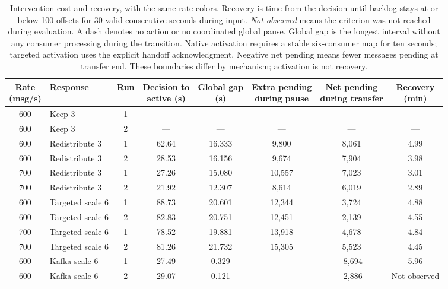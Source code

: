 \begin{table}[!htbp]
\centering\footnotesize
\setlength{\tabcolsep}{3pt}
\renewcommand{\arraystretch}{1.12}
\begin{tabular}{@{}clcccccc@{}}
\toprule
\rowcolor[HTML]{DDE3EA}
\shortstack{Rate\\(msg/s)} & Response & Run & \shortstack{Decision to\\active (s)} & \shortstack{Global gap\\(s)} & \shortstack{Extra pending\\during pause} & \shortstack{Net pending\\during transfer} & \shortstack{Recovery\\(min)}\\
\midrule
\rowcolor[HTML]{FFE1AD}
600 & Keep 3 & 1 & --- & --- & --- & --- & ---\\
\rowcolor[HTML]{FFE1AD}
600 & Keep 3 & 2 & --- & --- & --- & --- & ---\\
\rowcolor[HTML]{FFE1AD}
600 & Redistribute 3 & 1 & 62.64 & 16.333 & 9,800 & 8,061 & 4.99\\
\rowcolor[HTML]{FFE1AD}
600 & Redistribute 3 & 2 & 28.53 & 16.156 & 9,674 & 7,904 & 3.98\\
\rowcolor[HTML]{CFE2F3}
700 & Redistribute 3 & 1 & 27.26 & 15.080 & 10,557 & 7,023 & 3.01\\
\rowcolor[HTML]{CFE2F3}
700 & Redistribute 3 & 2 & 21.92 & 12.307 & 8,614 & 6,019 & 2.89\\
\rowcolor[HTML]{FFE1AD}
600 & Targeted scale 6 & 1 & 88.73 & 20.601 & 12,344 & 3,724 & 4.88\\
\rowcolor[HTML]{FFE1AD}
600 & Targeted scale 6 & 2 & 82.83 & 20.751 & 12,451 & 2,139 & 4.55\\
\rowcolor[HTML]{CFE2F3}
700 & Targeted scale 6 & 1 & 78.52 & 19.881 & 13,918 & 4,678 & 4.84\\
\rowcolor[HTML]{CFE2F3}
700 & Targeted scale 6 & 2 & 81.26 & 21.732 & 15,305 & 5,523 & 4.45\\
\rowcolor[HTML]{FFE1AD}
600 & Kafka scale 6 & 1 & 27.49 & 0.329 & --- & -8,694 & 5.96\\
\rowcolor[HTML]{FFE1AD}
600 & Kafka scale 6 & 2 & 29.07 & 0.121 & --- & -2,886 & Not observed\\
\bottomrule
\end{tabular}
\caption{Intervention cost and recovery, with the same rate colors. Recovery is time from the decision until backlog stays at or below 100 offsets for 30 valid consecutive seconds during input. \emph{Not observed} means the criterion was not reached during evaluation. A dash denotes no action or no coordinated global pause. Global gap is the longest interval without any consumer processing during the transition. Native activation requires a stable six-consumer map for ten seconds; targeted activation uses the explicit handoff acknowledgment. Negative net pending means fewer messages pending at transfer end. These boundaries differ by mechanism; activation is not recovery.}
\label{tab:four-partition-intervention-cost}
\end{table}
